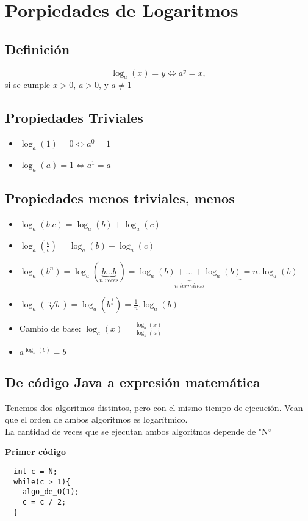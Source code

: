 \section{Porpiedades de Logaritmos}
\subsection{Definición}
\[ \log_a(x)=y  \Leftrightarrow a^y=x, \] si se cumple $x > 0$, $a > 0 $, y  $a \neq 1$
\subsection{Propiedades Triviales}
\begin{itemize}
 \item $ \log_a(1)=0 \Leftrightarrow a^0=1 $
 \item $ \log_a(a)=1 \Leftrightarrow a^1=a $
\end{itemize}

\subsection{Propiedades menos triviales, menos}
\begin{itemize}
 \item $ \log_a(b.c)=\log_a(b)+\log_a(c) $
 \item $ \log_a(\frac{b}{c})=\log_a(b)-\log_a(c) $
 \item $ \log_a(b^n)=\log_a(\underbrace{b\ldots b}_{n \; veces})= \underbrace{\log_a(b)+ \ldots + \log_a(b)}_{n \; terminos}= n.\log_a(b) $
 \item $ \log_a(\sqrt[n]{b})=\log_a(b^{\frac{1}{n}})=\frac{1}{n}. \log_a(b) $
 \item Cambio de base: $ \log_a(x)=\frac{\log_b(x)}{\log_b(a)} $
 \item $a^{\log_a(b)}=b$
\end{itemize}

\subsection{De código Java a expresión matemática}
Tenemos dos algoritmos distintos, pero con el mismo tiempo de ejecución. Vean que el orden de ambos algoritmos es logarítmico.\\
La cantidad de veces que se ejecutan ambos algoritmos depende de "N`` \newline

\textbf{Primer código}\\
\begin{verbatim}
  int c = N;
  while(c > 1){
    algo_de_O(1);
    c = c / 2;  
  }
\end{verbatim}

